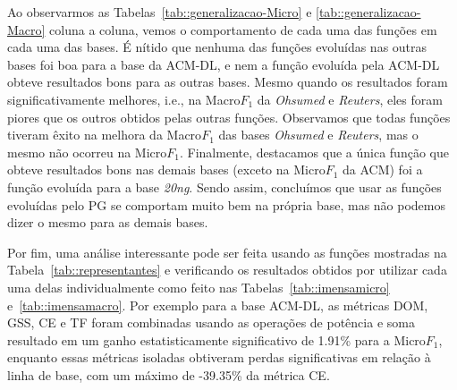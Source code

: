 Ao observarmos as Tabelas~\ref{tab::generalizacao-Micro} e \ref{tab::generalizacao-Macro} coluna a coluna, vemos o comportamento de cada uma das funções em cada uma das bases. É nítido que nenhuma das funções evoluídas nas outras bases foi boa para a base da \textsc{ACM-DL}, e nem a função evoluída pela \textsc{ACM-DL} obteve resultados bons para as outras bases. Mesmo quando os resultados foram significativamente melhores, i.e., na Macro$F_1$ da \textit{Ohsumed} e \textit{Reuters}, eles foram piores que os outros obtidos pelas outras funções.
Observamos que todas funções tiveram êxito na melhora da Macro$F_1$ das bases \textit{Ohsumed} e \textit{Reuters}, mas o mesmo não ocorreu na Micro$F_1$.
Finalmente, destacamos que a única função que obteve resultados bons nas demais bases (exceto na Micro$F_1$ da \textsc{ACM}) foi a função evoluída para a base \textit{20ng}.
Sendo assim, concluímos que usar as funções evoluídas pelo \textsc{PG} se comportam muito bem na própria base, mas não podemos dizer o mesmo para as demais bases.

Por fim, uma análise interessante pode ser feita usando as funções mostradas na Tabela~\ref{tab::representantes} e verificando os resultados obtidos por utilizar cada uma delas individualmente como feito nas Tabelas~\ref{tab::imensamicro} e~\ref{tab::imensamacro}. Por exemplo para a base \textsc{ACM-DL}, as métricas \textsc{DOM}, \textsc{GSS}, \textsc{CE} e \textsc{TF} foram combinadas usando as operações de potência e soma resultado em um ganho estatisticamente significativo de 1.91\% para a Micro$F_1$, enquanto essas métricas isoladas obtiveram perdas significativas em relação à linha de base, com um máximo de -39.35\% da métrica \textsc{CE}. 

